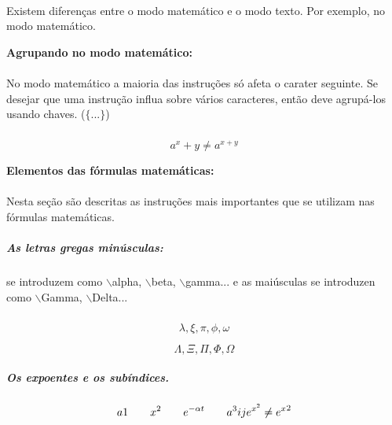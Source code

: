 \documentclass[a4paper, 12pt]{article} %
\begin{document}
\paragraph{} Existem diferenças entre o modo matemático e o modo texto. Por exemplo, no modo matemático. %

\begin{flushleft} %
\textbf{Agrupando no modo matemático:} %
\end{flushleft} %

\paragraph{} No modo matemático a maioria das instruções só afeta o carater seguinte. Se desejar que uma instrução influa sobre vários caracteres, então deve agrupá-los usando chaves. ($\lbrace$...$\rbrace$) %

\subparagraph{} %
\begin{equation} %
a^x+y \neq a^{x+y} %
\end{equation} %

\begin{flushleft} 
\textbf{Elementos das fórmulas matemáticas:}
\end{flushleft}

\paragraph{} Nesta seção são descritas as instruções mais importantes que se utilizam nas fórmulas matemáticas. %

\subparagraph{As letras gregas minúsculas:}se introduzem como $\backslash$alpha, $\backslash$beta, $\backslash$gamma... e as maiúsculas se introduzen como $\backslash$Gamma, $\backslash$Delta... %

\subparagraph{}
\begin{equation}
\lambda, \xi, \pi, \phi, \omega
\end{equation}

\begin{equation}
\Lambda, \Xi, \Pi, \Phi, \Omega
\end{equation}

\subparagraph{Os expoentes e os subíndices.} 
\begin{equation}
a {1} \qquad x^{2} \qquad
e^{-\alpha t} \qquad a^{3} {ij}\\
e^{x^2} \neq {e^x}^2
\end{equation}
\end{document}
